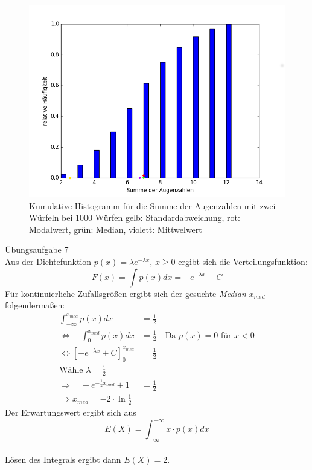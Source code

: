 \documentclass[fleqn,a4paper,12pt]{article}
\begin{document}
  \begin{figure}
    \includegraphics[width=1.0\textwidth]{histo5.png}
    \caption{Kumulative Histogramm für die Summe der Augenzahlen mit zwei Würfeln bei 1000 Würfen \newline gelb: Standardabweichung, rot: Modalwert, grün: Median, violett: Mittwelwert}
  \end{figure}
  \pagebreak
  Übungsaufgabe 7 \\
  Aus der Dichtefunktion $p(x) = \lambda e^{-\lambda x}$, $x \geq 0$ ergibt sich die Verteilungsfunktion: \[F(x) = \int p(x) dx = -e^{-\lambda x} + C\]
  Für kontinuierliche Zufallsgrößen ergibt sich der gesuchte \textit{Median} $x_{med}$ folgendermaßen:
  \begin{align*}
      \int_{-\infty}^{x_{med}} p(x) dx &= \frac{1}{2} \\
      \Leftrightarrow \quad \int_0^{x_{med}} p(x) dx &= \frac{1}{2} \quad \text{Da }  p(x) = 0 \text{ für } x < 0 \\
      \Leftrightarrow \left[ -e^{-\lambda x} + C \right]_{0}^{x_{med}} &= \frac{1}{2} \\
      \text{Wähle } \lambda = \frac{1}{2} \\
      \Rightarrow \quad -e^{-\frac{1}{2}x_{med}} + 1 &= \frac{1}{2} \\
      \Rightarrow x_{med} = -2 \cdot \ln \frac{1}{2}
  \end{align*}
  Der Erwartungswert ergibt sich aus \[E(X) = \int_{-\infty}^{+\infty} x \cdot  p(x) dx\] \\
  Lösen des Integrals ergibt dann $E(X) = 2$. \\
\end{document}

